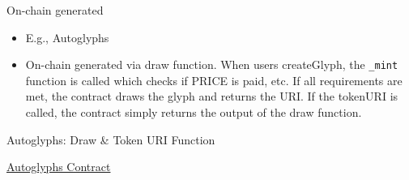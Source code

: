 \documentclass[handout]{beamer}
\begin{document}
\begin{frame}{On-chain generated}
	\begin{itemize}
		\item E.g., Autoglyphs
		\item On-chain generated via draw function. When users createGlyph, the \texttt{\_mint} function is called which checks if PRICE is paid, etc. If all requirements are met, the contract draws the glyph and returns the URI. If the tokenURI is called, the contract simply returns the output of the draw function.
	\end{itemize}
	\begin{samplecode}{Autoglyphs: Draw \& Token URI Function}
		
	\end{samplecode}
	\vspace{-0.5em}
	\begin{center}
		\link \href{https://etherscan.io/address/0xd4e4078ca3495de5b1d4db434bebc5a986197782}{Autoglyphs Contract}
	\end{center}
\end{frame}
\end{document}
